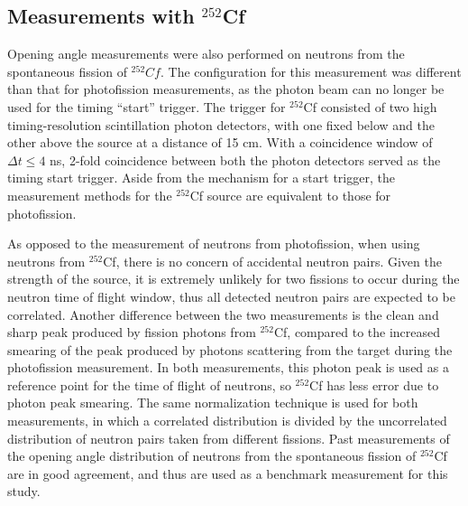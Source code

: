 \subsection{Measurements with $^{252}$Cf}

Opening angle measurements were also performed on neutrons from the spontaneous fission of $^{252}Cf$.
The configuration for this measurement was different than that for photofission measurements, as the photon beam can no longer be used for the timing ``start'' trigger.
The trigger for $^{252}$Cf consisted of two high timing-resolution scintillation photon detectors, with one fixed below and the other above the source at a distance of 15 cm.
With a coincidence window of $\Delta t\leq 4$ ns, 2-fold coincidence between both the photon detectors served as the timing start trigger.
Aside from the mechanism for a start trigger, the measurement methods for the $^{252}$Cf source are equivalent to those for photofission.

As opposed to the measurement of neutrons from photofission, when using neutrons from $^{252}$Cf, there is no concern of accidental neutron pairs.
Given the strength of the source, it is extremely unlikely for two fissions to occur during the neutron time of flight window, thus all detected neutron pairs are expected to be correlated.
Another difference between the two measurements is the clean and sharp peak produced by fission photons from $^{252}$Cf, compared to the increased smearing of the peak produced by photons scattering from the target during the photofission measurement.
In both measurements, this photon peak is used as a reference point for the time of flight of neutrons, so $^{252}$Cf has less error due to photon peak smearing.
The same normalization technique is used for both measurements, in which a correlated distribution is divided by the uncorrelated distribution of neutron pairs taken from different fissions.
Past measurements of the opening angle distribution of neutrons from the spontaneous fission of $^{252}$Cf are in good agreement, and thus are used as a benchmark measurement for this study.

